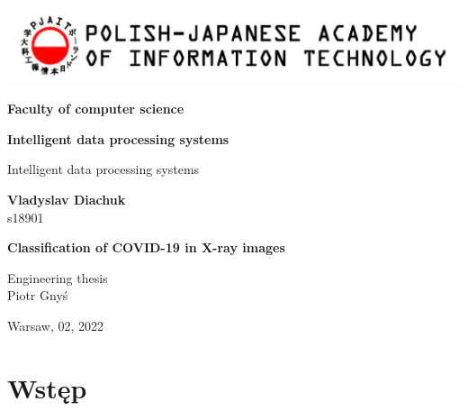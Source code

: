 \documentclass{article}
\begin{document}
\begin{titlepage}          
	\sffamily                                                                              
	\includegraphics[width=\textwidth]{pjwstk_logo_en}
	
	\vspace{1.4cm}
	
	\begin{center}
		{
			\Large
			\textbf{Faculty of computer science}
			\vspace{1.4cm}
			
			\textbf{Intelligent data processing systems}
			\vspace{0.5cm}
			
			Intelligent data processing systems
			\vspace{1.4cm}
			
			\textbf{Vladyslav Diachuk}\\
			s18901
		}
		\vspace{1.2cm}
		
		{\huge\textbf{Classification of COVID-19 in X-ray images}}
	\end{center}
	\vspace{2cm}
	
	\begin{flushright}
		\Large
		Engineering thesis\\	
		\vspace{0.4cm}	
		Piotr Gnyś
	\end{flushright}
	\vspace{3cm}
	
	\begin{center}
		\Large
		Warsaw, 02, 2022
	\end{center}
	
\end{titlepage}

\section{Wstęp}

\end{document}
